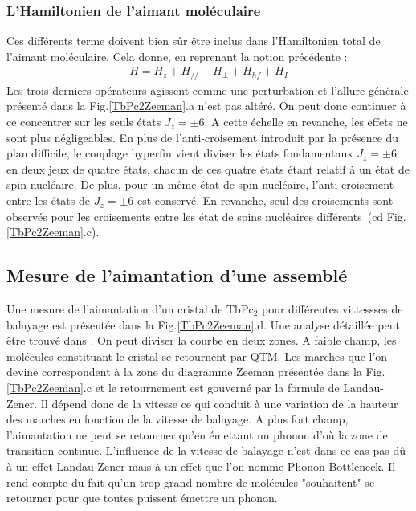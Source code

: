 \subsubsection{L'Hamiltonien de l'aimant moléculaire}

Ces différents terme doivent bien s\^ur \^etre inclus dans l'Hamiltonien total de l'aimant moléculaire. Cela donne, en reprenant la notion précédente :
\begin{eqnarray}
H = H_z + H_{//} + H_{\perp} + H_{hf} + H_I
\end{eqnarray}
Les trois derniers opérateurs agissent comme une perturbation et l'allure générale présenté dans la Fig.\ref{TbPc2Zeeman}.a n'est pas altéré. On peut donc continuer à ce concentrer sur les seuls états $J_z = \pm 6$. A cette échelle en revanche, les effets ne sont plus négligeables. En plus de l'anti-croisement introduit par la présence du plan difficile, le couplage hyperfin vient diviser les états fondamentaux  $J_z = \pm 6$ en deux jeux de quatre états, chacun de ces quatre états étant relatif à un état de spin nucléaire. De plus, pour un m\^eme état de spin nucléaire, l'anti-croisement entre les états de  $J_z = \pm 6$ est conservé. En revanche, seul des croisements sont observés pour les croisements entre les état de spins nucléaires différents~(cd Fig. \ref{TbPc2Zeeman}.c).


\subsection{Mesure de l'aimantation d'une assemblé}

Une mesure de l'aimantation d'un cristal de TbPc$_2$ pour différentes vittessses de balayage est présentée dans la Fig.\ref{TbPc2Zeeman}.d. Une analyse détaillée peut \^etre trouvé dans \cite{Ishikawa2005}. On peut diviser la courbe en deux zones. A faible champ, les molécules constituant le cristal se retournent par QTM. Les marches que l'on devine correspondent à la zone du diagramme Zeeman présentée dans la Fig.\ref{TbPc2Zeeman}.c et le retournement est gouverné par la formule de Landau-Zener. Il dépend donc de la vitesse ce qui conduit à une variation de la hauteur des marches en fonction de la vitesse de balayage. A plus fort champ, l'aimantation ne peut se retourner qu'en émettant un phonon d'où la zone de transition continue. L'influence de la vitesse de balayage n'est dans ce cas pas d\^u à un effet Landau-Zener mais à un effet que l'on nomme Phonon-Bottleneck. Il rend compte du fait qu'un trop grand nombre de molécules "souhaitent" se retourner pour que toutes puissent émettre un phonon.

